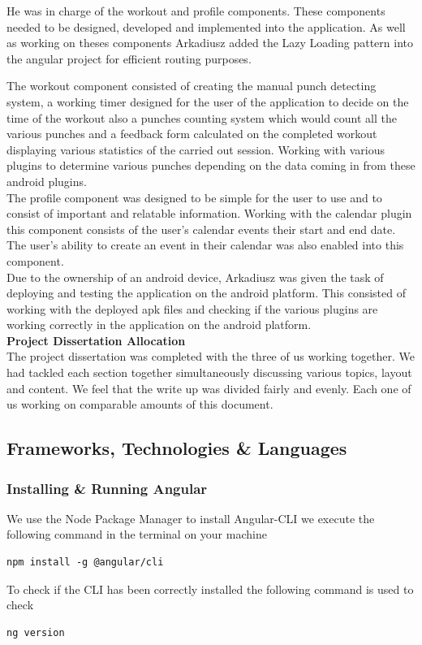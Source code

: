 \documentclass[a4paper,12pt]{report}
\begin{document}
He was in charge of the workout and profile components. These components needed to be designed, developed and implemented into the application.
As well as working on theses components Arkadiusz added the Lazy Loading pattern into the angular project for efficient routing purposes.

The workout component consisted of creating the manual punch detecting system, a working timer designed for the user of the application to decide on the time of the workout also a punches counting system which would count all the various punches and a feedback form calculated on the completed workout displaying various statistics of the carried out session.
Working with various plugins to determine various punches depending on the data coming in from these android plugins.\\

The profile component was designed to be simple for the user to use and to consist of important and relatable information.
Working with the calendar plugin this component consists of the user's calendar events their start and end date. The user's ability to create an event in their calendar was also enabled into this component.\\

Due to the ownership of an android device, Arkadiusz was given the task of deploying and testing the application on the android platform. This consisted of working with the deployed apk files and checking if the various plugins are working correctly in the application on the android platform.\\

\textbf{Project Dissertation Allocation}\\
The project dissertation was completed with the three of us working together. We had tackled each section together simultaneously discussing various topics, layout and content.
We feel that the write up was divided fairly and evenly. Each one of us working on comparable amounts of this document.


\subsection{Frameworks, Technologies \& Languages}
\subsubsection{Installing \& Running Angular}
We use the Node Package Manager to install Angular-CLI we execute the following command in the terminal on your machine 
\begin{verbatim}
npm install -g @angular/cli
\end{verbatim}
To check if the CLI has been correctly installed the following command is used to check
\begin{verbatim}
ng version
\end{verbatim}
\end{document}
